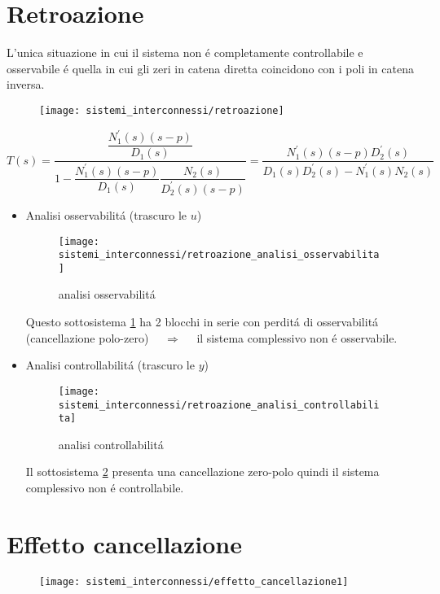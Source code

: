\documentclass[../main.tex]{subfiles}
\begin{document}
	\section{Retroazione}
		L'unica situazione in cui il sistema non \'e completamente controllabile e osservabile \'e quella in cui gli zeri in catena diretta coincidono con i poli in catena inversa.
		\begin{figure}[H]
			\centering\texttt{[image: sistemi\_interconnessi/retroazione]}
		\end{figure}
	
		\[
			T(s) = \dfrac{\dfrac{N_1^{'}(s) (s-p)}{D_1(s)}}{1-\dfrac{N_1^{'}(s) (s-p)}{D_1(s)}\dfrac{N_2(s)}{D_2^{'}(s)(s-p)}} = \dfrac{N_1^{'}(s) (s-p) D_2^{'}(s)}{D_1(s)D_2^{'}(s) - N_1^{'}(s)N_2(s)}
		\]
		\begin{itemize}
			\item 
				Analisi osservabilit\'a (trascuro le $ u $)
				\begin{figure}[H]
					\centering\texttt{[image: sistemi\_interconnessi/retroazione\_analisi\_osservabilita]}
					\caption{analisi osservabilit\'a}
					\label{fig:retroazione_analisi_osservabilita}
				\end{figure}
			
				Questo sottosistema \ref{fig:retroazione_analisi_osservabilita} ha 2 blocchi in serie con perdit\'a di osservabilit\'a (cancellazione polo-zero) $ \quad\Rightarrow\quad $ il sistema complessivo non \'e osservabile.
			\item 
				Analisi controllabilit\'a (trascuro le $ y $)
				\begin{figure}[H]
					\centering\texttt{[image: sistemi\_interconnessi/retroazione\_analisi\_controllabilita]}
					\caption{analisi controllabilit\'a}
					\label{fig:retroazione_analisi_controllabilita}
				\end{figure}
				
				Il sottosistema \ref{fig:retroazione_analisi_controllabilita} presenta una cancellazione zero-polo quindi il sistema complessivo non \'e controllabile.
		\end{itemize}
	
	\section{Effetto cancellazione}
		\begin{figure}[H]
			\centering\texttt{[image: sistemi\_interconnessi/effetto\_cancellazione1]}
			\label{fig:effetto_cancellazione1}
		\end{figure}
	
\end{document}
